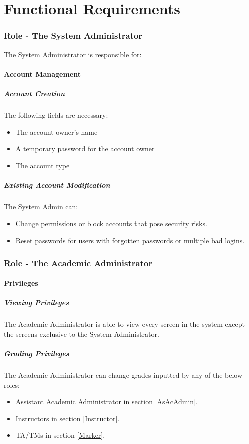 \documentclass{article}
\begin{document}
\part{Functional Requirements}
\section{Role - The System Administrator \label{SysAdmin}}
The System Administrator is responsible for:
\subsection{Account Management}
\subsubsection{Account Creation \label{Account Creation}}
The following fields are necessary:
\begin{itemize}
  \item The account owner's name
  \item A temporary password for the account owner
  \item The account type
\end{itemize}
\subsubsection{Existing Account Modification}
The System Admin can:
\begin{itemize}
  \item Change permissions or block accounts that pose security risks.
  \item Reset passwords for users with forgotten passwords or multiple bad logins.
\end{itemize}

\section{Role - The Academic Administrator \label{AcAdmin}}
\subsection{Privileges}
\subsubsection{Viewing Privileges}
The Academic Administrator is able to view every screen in the system except the screens exclusive to the System Administrator.
\subsubsection{Grading Privileges}
The Academic Administrator can change grades inputted by any of the below roles:
\begin{itemize}
  \item Assistant Academic Administrator in section \ref{AsAcAdmin}.
  \item Instructors  in section \ref{Instructor}.
  \item TA/TMs in section \ref{Marker}.
\end{itemize}
\end{document}
